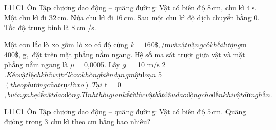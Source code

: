 \begin{ex}
L11C1 Ôn Tập chương dao động – quãng đường: Vật có biên độ $8\,\text{cm}$, chu kì $4\,\text{s}$.
\choiceTF
{\True Một chu kì đi $32\,\text{cm}$.}
{\True Nửa chu kì đi $16\,\text{cm}$.}
{\True Sau một chu kì độ dịch chuyển bằng 0.}
{\True Tốc độ trung bình là $8\,\text{cm}$ /s.}
\end{ex}

\begin{ex}
Một con lắc lò xo gồm lò xo có độ cứng $k = 160\$, $/m$ và vật nặng có khối lượng $m = 400\$, $\mathrm{g},$ đặt trên mặt phẳng nằm ngang. Hệ số ma sát trượt giữa vật và mặt phẳng nằm ngang là $\mu = 0$,0005. Lấy $g =$ 10 $\mathrm{m/s}$ 2 $. Kéo vật lệch khỏi vị trí lò xo không biến dạng một đoạn$ 5  $(theo phương của trục lò xo). Tại$ t = 0 $, buông nhẹ để vật dao động. Tính thời gian kể từ lúc vật bắt đầu dao động cho đến khi vật dừng hẳn.$ 
\choiceTF

\end{ex}

\begin{ex}
L11C1 Ôn Tập chương dao động – quãng đường: Vật có biên độ $5\,\text{cm}$. Quãng đường trong 3 chu kì theo cm bằng bao nhiêu?
\end{ex}

